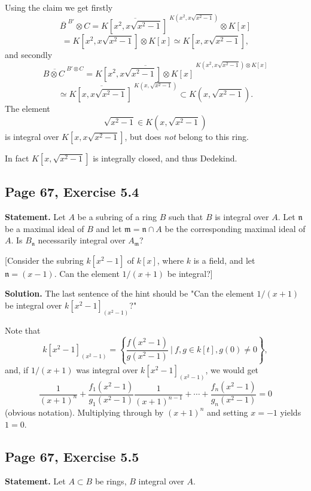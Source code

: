 \documentclass[parskip=half,fontsize=12pt]{scrartcl}%
\newcommand{\mf}{\mathfrak}
\newcommand{\mmm}{\mf m}
\newcommand{\nnn}{\mf n}
\begin{document}
Using the claim we get firstly
$$
\overline{B\ }^{B'}\otimes C=\overline{K\left[x^2,x\sqrt{x^2-1}\right]\ }^{K\left(x^2,x\sqrt{x^2-1}\right)}\otimes K[x]
$$
$$
=K\left[x^2,x\sqrt{x^2-1}\right]\otimes K[x]\simeq K\left[x,x\sqrt{x^2-1}\right],
$$ 
and secondly 
$$ 
\overline{B\otimes C\ }^{B'\otimes C}=\overline{K\left[x^2,x\sqrt{x^2-1}\right]\otimes K[x]\ }^{K\left(x^2,x\sqrt{x^2-1}\right)\otimes K[x]}
$$
$$
\simeq\overline{K\left[x,x\sqrt{x^2-1}\right]\ }^{K\left(x,\sqrt{x^2-1}\right)}\subset K\left(x,\sqrt{x^2-1}\right).
$$ 
The element 
$$
\sqrt{x^2-1}\in K\left(x,\sqrt{x^2-1}\right)
$$ 
is integral over $K\left[x,x\sqrt{x^2-1}\right]$, but does \emph{not} belong to this ring.

In fact $K\left[x,\sqrt{x^2-1}\right]$ is integrally closed, and thus Dedekind.


\subsection{Page 67, Exercise 5.4}%

\textbf{Statement.} Let $A$ be a subring of a ring $B$ such that $B$ is integral over $A$. Let $\nnn$ be a maximal ideal of $B$ and let $\mmm=\nnn\cap A$ be the corresponding maximal ideal of $A$. Is $B_\nnn$ necessarily integral over $A_\mmm$?

[Consider the subring $k[x^2-1]$ of $k[x]$, where $k$ is a field, and let $\nnn=(x-1)$. Can the element $1/(x+1)$ be integral?]

\textbf{Solution.} %
The last sentence of the hint should be "Can the element $1/(x + 1)$ be integral over $k[x^2-1]_{(x^2-1)}$?" 

Note that 
$$
k[x^2-1]_{(x^2-1)}=\left\{\frac{f(x^2-1)}{g(x^2-1)}\ \bigg|\ f,g\in k[t],g(0)\ne0\right\},
$$ 
and, if $1/(x + 1)$ was integral over $k[x^2-1]_{(x^2-1)}$, we would get 
$$
\frac1{(x+1)^n}+\frac{f_1(x^2-1)}{g_1(x^2-1)}\frac1{(x+1)^{n-1}}+\cdots+\frac{f_n(x^2-1)}{g_n(x^2-1)}=0
$$ 
(obvious notation). Multiplying through by $(x+1)^n$ and setting $x=-1$ yields $1=0$. 

\subsection{Page 67, Exercise 5.5}\label{55}%

\textbf{Statement.} Let $A\subset B$ be rings, $B$ integral over $A$.
\end{document}

